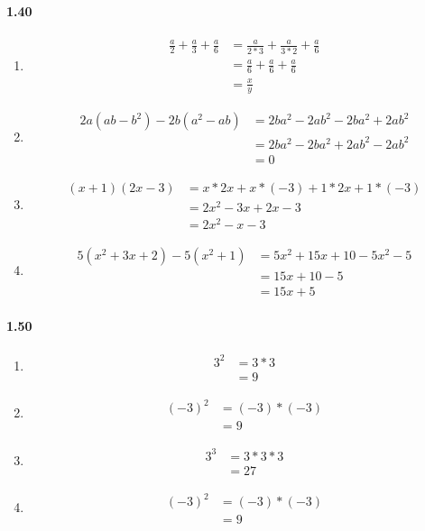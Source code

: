 \documentclass{article}
\newcommand\litem[1]{\item{\bfseries#1\space}}
\begin{document}
\paragraph{1.40}
\begin{enumerate}[label=\emph{\alph*})]
\litem{
\begin{align*}
  \frac{a}{2} + \frac{a}{3} + \frac{a}{6} &= \frac{a}{2*3} + \frac{a}{3*2} + \frac{a}{6} \\
  &= \frac{a}{6} + \frac{a}{6} + \frac{a}{6} \\
  &= \frac{x}{y}
\end{align*}
}
\litem{
\begin{align*}
  2a(ab - b^2) - 2b(a^2 - ab) &= 2ba^2 - 2ab^2 - 2ba^2 + 2ab^2 \\
  &= 2ba^2 - 2ba^2 + 2ab^2 - 2ab^2 \\
  &= 0
\end{align*}
}
\litem{
\begin{align*}
  (x + 1)(2x - 3) &= x * 2x + x * (-3) + 1 * 2x + 1 * (-3) \\
  &= 2x^2 - 3x + 2x - 3 \\
  &= 2x^2 - x - 3
\end{align*}
}
\litem{
\begin{align*}
  5(x^2 + 3x + 2) - 5(x^2 + 1) &= 5x^2 + 15x + 10 - 5x^2 - 5 \\
  &= 15x + 10 - 5 \\
  &= 15x + 5
\end{align*}
}
\end{enumerate}

\paragraph{1.50}
\begin{enumerate}[label=\emph{\alph*})]
\litem{
\begin{align*}
  3^2 &= 3 * 3 \\
  &= 9
\end{align*}
}
\litem{
\begin{align*}
  (-3)^2 &= (-3) * (-3) \\
  &= 9
\end{align*}
}
\litem{
\begin{align*}
  3^3 &= 3 * 3 * 3 \\
  &= 27
\end{align*}
}
\litem{
\begin{align*}
  (-3)^2 &= (-3) * (-3) \\
  &= 9
\end{align*}
}
\end{enumerate}
\end{document}
